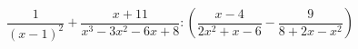 \begin{ex}[type=expression]
	\begin{condition}
		 \( \dfrac{1}{(x-1)^2}+\dfrac{x+11}{x^3-3x^2-6x+8}:\left( \dfrac{x-4}{2x^2+x-6}-\dfrac{9}{8+2x-x^2} \right) \)
	\end{condition}
\end{ex}